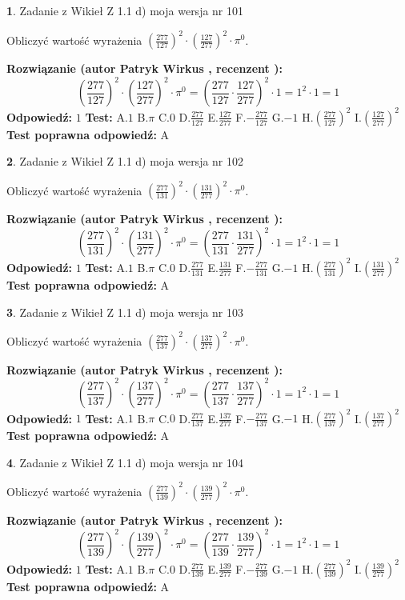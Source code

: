 \documentclass[12pt, a4paper]{article}
\theoremstyle{definition} %
\newtheorem{zad}{}
\newcommand{\zadStart}[1]{\begin{zad}#1\newline}
\newcommand{\zadStop}{\end{zad}}
\newcommand{\rozwStart}[2]{\noindent \textbf{Rozwiązanie (autor #1 , recenzent #2): }\newline}
\newcommand{\rozwStop}{\newline}
\newcommand{\odpStart}{\noindent \textbf{Odpowiedź:}\newline}
\newcommand{\odpStop}{\newline}
\newcommand{\testStart}{\noindent \textbf{Test:}\newline}
\newcommand{\testStop}{\newline}
\newcommand{\kluczStart}{\noindent \textbf{Test poprawna odpowiedź:}\newline}
\newcommand{\kluczStop}{\newline}
\begin{document}
\zadStart{Zadanie z Wikieł Z 1.1 d) moja wersja nr 101}

Obliczyć wartość wyrażenia $(\frac{277}{127})^{2} \cdot (\frac{127}{277})^{2} \cdot \pi^{0}$.
\zadStop
\rozwStart{Patryk Wirkus}{}
$$(\frac{277}{127})^{2} \cdot (\frac{127}{277})^{2} \cdot \pi^{0} = (\frac{277}{127} \cdot \frac{127}{277})^{2} \cdot 1 = 1^{2} \cdot 1 = 1$$
\rozwStop
\odpStart
$1$
\odpStop
\testStart
A.$1$ B.$\pi$ C.$0$ D.$\frac{277}{127}$ E.$\frac{127}{277}$
F.$-\frac{277}{127}$ G.$-1$
H.$(\frac{277}{127})^{2}$
I.$(\frac{127}{277})^{2}$
\testStop
\kluczStart
A
\kluczStop



\zadStart{Zadanie z Wikieł Z 1.1 d) moja wersja nr 102}

Obliczyć wartość wyrażenia $(\frac{277}{131})^{2} \cdot (\frac{131}{277})^{2} \cdot \pi^{0}$.
\zadStop
\rozwStart{Patryk Wirkus}{}
$$(\frac{277}{131})^{2} \cdot (\frac{131}{277})^{2} \cdot \pi^{0} = (\frac{277}{131} \cdot \frac{131}{277})^{2} \cdot 1 = 1^{2} \cdot 1 = 1$$
\rozwStop
\odpStart
$1$
\odpStop
\testStart
A.$1$ B.$\pi$ C.$0$ D.$\frac{277}{131}$ E.$\frac{131}{277}$
F.$-\frac{277}{131}$ G.$-1$
H.$(\frac{277}{131})^{2}$
I.$(\frac{131}{277})^{2}$
\testStop
\kluczStart
A
\kluczStop



\zadStart{Zadanie z Wikieł Z 1.1 d) moja wersja nr 103}

Obliczyć wartość wyrażenia $(\frac{277}{137})^{2} \cdot (\frac{137}{277})^{2} \cdot \pi^{0}$.
\zadStop
\rozwStart{Patryk Wirkus}{}
$$(\frac{277}{137})^{2} \cdot (\frac{137}{277})^{2} \cdot \pi^{0} = (\frac{277}{137} \cdot \frac{137}{277})^{2} \cdot 1 = 1^{2} \cdot 1 = 1$$
\rozwStop
\odpStart
$1$
\odpStop
\testStart
A.$1$ B.$\pi$ C.$0$ D.$\frac{277}{137}$ E.$\frac{137}{277}$
F.$-\frac{277}{137}$ G.$-1$
H.$(\frac{277}{137})^{2}$
I.$(\frac{137}{277})^{2}$
\testStop
\kluczStart
A
\kluczStop



\zadStart{Zadanie z Wikieł Z 1.1 d) moja wersja nr 104}

Obliczyć wartość wyrażenia $(\frac{277}{139})^{2} \cdot (\frac{139}{277})^{2} \cdot \pi^{0}$.
\zadStop
\rozwStart{Patryk Wirkus}{}
$$(\frac{277}{139})^{2} \cdot (\frac{139}{277})^{2} \cdot \pi^{0} = (\frac{277}{139} \cdot \frac{139}{277})^{2} \cdot 1 = 1^{2} \cdot 1 = 1$$
\rozwStop
\odpStart
$1$
\odpStop
\testStart
A.$1$ B.$\pi$ C.$0$ D.$\frac{277}{139}$ E.$\frac{139}{277}$
F.$-\frac{277}{139}$ G.$-1$
H.$(\frac{277}{139})^{2}$
I.$(\frac{139}{277})^{2}$
\testStop
\kluczStart
A
\kluczStop
\end{document}
